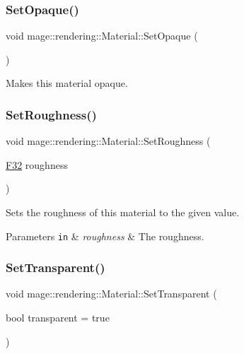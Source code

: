 \subsubsection{\texorpdfstring{Set\+Opaque()}{SetOpaque()}}
{\footnotesize\ttfamily void mage\+::rendering\+::\+Material\+::\+Set\+Opaque (\begin{DoxyParamCaption}{ }\end{DoxyParamCaption})\hspace{0.3cm}{\ttfamily [noexcept]}}

Makes this material opaque. \hypertarget{classmage_1_1rendering_1_1_material_a1504fb6523526ee9897b20851a3b84e9}{}\label{classmage_1_1rendering_1_1_material_a1504fb6523526ee9897b20851a3b84e9} 
\subsubsection{\texorpdfstring{Set\+Roughness()}{SetRoughness()}}
{\footnotesize\ttfamily void mage\+::rendering\+::\+Material\+::\+Set\+Roughness (\begin{DoxyParamCaption}\item[{\hyperlink{namespacemage_aa97e833b45f06d60a0a9c4fc22ae02c0}{F32}}]{roughness }\end{DoxyParamCaption})\hspace{0.3cm}{\ttfamily [noexcept]}}

Sets the roughness of this material to the given value.


\begin{DoxyParams}[1]{Parameters}
\mbox{\tt in}  & {\em roughness} & The roughness. \\
\hline
\end{DoxyParams}
\hypertarget{classmage_1_1rendering_1_1_material_a8da0e0ed4df1e9ce0c7381d88b6d6c48}{}\label{classmage_1_1rendering_1_1_material_a8da0e0ed4df1e9ce0c7381d88b6d6c48} 
\subsubsection{\texorpdfstring{Set\+Transparent()}{SetTransparent()}}
{\footnotesize\ttfamily void mage\+::rendering\+::\+Material\+::\+Set\+Transparent (\begin{DoxyParamCaption}\item[{bool}]{transparent = {\ttfamily true} }\end{DoxyParamCaption})\hspace{0.3cm}{\ttfamily [noexcept]}}

